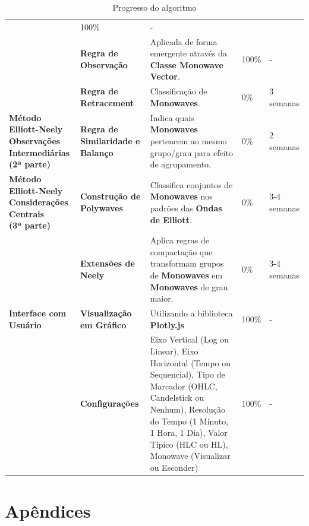 \documentclass[12pt]{article}
\begin{document}
\begin{table}[H]
\begin{tabular}{|L{3cm}|L{2cm}|L{5cm}|R{1.4cm}|R{1.4cm}|}
		& 100\%
		& - \\
		& \textbf{Regra de Observação}
		& Aplicada de forma emergente através da \textbf{Classe Monowave Vector}.
		& 100\%
		& - \\
		& \textbf{Regra de Retracement}
		& Classificação de \textbf{Monowaves}.
		& 0\%
		& 3 semanas \\
	\hline
	\textbf{Método Elliott-Neely \newline Observações Intermediárias \newline (2ª parte)}
		& \textbf{Regra de Similaridade e Balanço}
		& Indica quais \textbf{Monowaves} pertencem ao mesmo grupo/grau para efeito de agrupamento.
		& 0\%
		& 2 semanas \\
	\hline
	\textbf{Método Elliott-Neely \newline Considerações Centrais \newline (3ª parte)}
		& \textbf{Construção de Polywaves}
		& Classifica conjuntos de \textbf{Monowaves} nos padrões das \textbf{Ondas de Elliott}.
		& 0\%
		& 3-4 semanas \\
		& \textbf{Extensões de Neely}
		& Aplica regras de compactação que transformam grupos de \textbf{Monowaves} em \textbf{Monowaves} de grau maior.
		& 0\%
		& 3-4 semanas \\
	\hline
	\textbf{Interface com Usuário}
		& \textbf{Visualização em Gráfico}
		& Utilizando a biblioteca \textbf{Plotly.js}
		& 100\%
		& - \\
		& \textbf{Configurações}
		& Eixo Vertical (Log ou Linear), Eixo Horizontal (Tempo ou Sequencial), Tipo de Marcador (OHLC, Candelstick ou Nenhum), Resolução do Tempo (1 Minuto, 1 Hora, 1 Dia), Valor Típico (HLC ou HL), Monowave (Visualizar ou Esconder)
		& 100\%
		& - \\
	\hline
\end{tabular} 
\caption{Progresso do algoritmo}
\label{tab:progresso}
\end{table}
\endgroup

\newpage

\raggedright



\newpage

{}
\section*{Apêndices}
\renewcommand{\thesubsection}{\Alph{subsection}}
\end{document}
